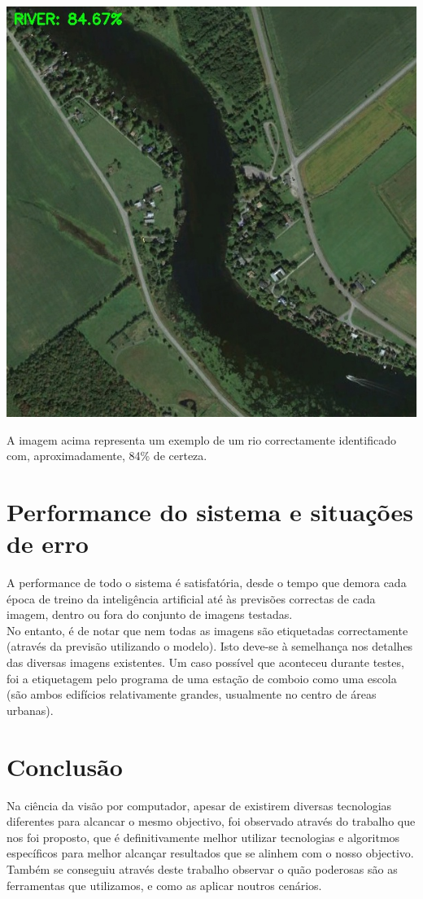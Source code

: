 \documentclass[extendedabs]{vcom}
\begin{document}
\includegraphics[scale=0.3]{Prediction.jpg}

A imagem acima representa um exemplo de um rio correctamente identificado com, aproximadamente, 84\% de certeza.

\section{Performance do sistema e situações de erro}

A performance de todo o sistema é satisfatória, desde o tempo que demora cada época de treino da inteligência artificial até às previsões correctas de cada imagem, dentro ou fora do conjunto de imagens testadas. \\
No entanto, é de notar que nem todas as imagens são etiquetadas correctamente (através da previsão utilizando o modelo). Isto deve-se à semelhança nos detalhes das diversas imagens existentes. Um caso possível que aconteceu durante testes, foi a etiquetagem pelo programa de uma estação de comboio como uma escola (são ambos edifícios relativamente grandes, usualmente no centro de áreas urbanas).

\section{Conclusão}

Na ciência da visão por computador, apesar de existirem diversas tecnologias diferentes para alcancar o mesmo objectivo, foi observado através do trabalho que nos foi proposto, que é definitivamente melhor utilizar tecnologias e algoritmos específicos para melhor alcançar resultados que se alinhem com o nosso objectivo. \\
Também se conseguiu através deste trabalho observar o quão poderosas são as ferramentas que utilizamos, e como as aplicar noutros cenários.

\nocite{*}





\end{document}
